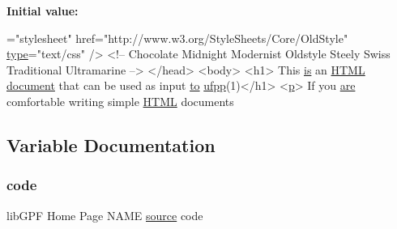 {\bfseries Initial value\+:}
\begin{DoxyCode}
=\textcolor{stringliteral}{"stylesheet"} href=\textcolor{stringliteral}{"http://www.w3.org/StyleSheets/Core/OldStyle"} \hyperlink{create__watch_83_8txt_a6036c8b9d18bd95ef0feb888982faa0b}{type}=\textcolor{stringliteral}{"text/css"} />
           <!-- Chocolate Midnight Modernist Oldstyle Steely Swiss Traditional Ultramarine -->
        </head>
        <body>
        <h1> This \hyperlink{M__journal_83_8txt_af78cd777fb46433462e3afacb9c375fd}{is} an \hyperlink{README_8txt_ad2be234454502f9b6337665f9aa3f7aa}{HTML} \hyperlink{namespacem__fpp_a36ad74639f1f01dd0ac08e59e6943778}{document} that can be used as input \hyperlink{M__stopwatch_83_8txt_a97209fd3e34ef701c0a9734280779cbb}{to} 
      \hyperlink{ufpp__overview_81_8txt_a97c20a96bcab81bc74c9d64b001f1202}{ufpp}(1)</h1>
        <\hyperlink{namespacem__writegif_a34d3a64b1381a281909da380d922d770}{p}>
            If you \hyperlink{M__stopwatch_83_8txt_a5040be02b832eba08820289c8a1f81c4}{are} comfortable writing simple \hyperlink{README_8txt_ad2be234454502f9b6337665f9aa3f7aa}{HTML} documents
\end{DoxyCode}


\subsection{Variable Documentation}
\mbox{\label{ufpp__overview_81_8txt_a74a0615f2d9c4a398d9126096f8092f8}} 
\subsubsection{\texorpdfstring{code}{code}}
{\footnotesize\ttfamily lib\+G\+PF Home Page N\+A\+ME \hyperlink{ufpp__overview_81_8txt_a4d6669ece605d05985c83a04dd38e0ad}{source} code}

\mbox{\label{ufpp__overview_81_8txt_a5673f2294ff1627be40c90eae33141ca}} 
